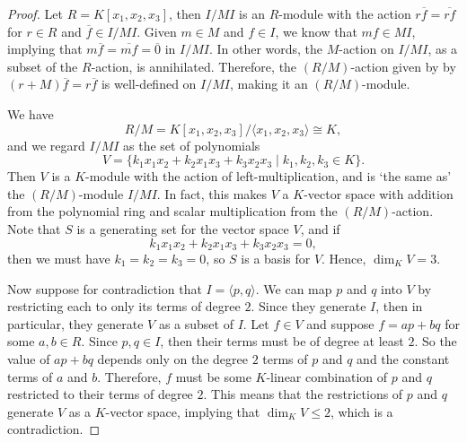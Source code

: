 \documentclass[12pt]{article}
\theoremstyle{definition}
\newcommand{\<}{\langle}
\renewcommand{\>}{\rangle}
\newcommand{\eqc}{\overline}
\newcommand{\isom}{\cong}
\begin{document}
\begin{proof}
    Let $R = K[x_1, x_2, x_3]$, then $I/MI$ is an $R$-module with the action $r\eqc{f} = \eqc{rf}$ for $r \in R$ and $\eqc{f} \in I/MI$. Given $m \in M$ and $f \in I$, we know that $mf \in MI$, implying that $m\eqc{f} = \eqc{mf} = \eqc{0}$ in $I/MI$. In other words, the $M$-action on $I/MI$, as a subset of the $R$-action, is annihilated. Therefore, the $(R/M)$-action given by by $(r + M)\eqc{f} = r\eqc{f}$ is well-defined on $I/MI$, making it an $(R/M)$-module.
    
    We have
    \[
        R/M = K[x_1, x_2, x_3]/\<x_1, x_2, x_3\> \isom K,
    \]
    and we regard $I/MI$ as the set of polynomials
    \[
        V = \{k_1x_1x_2 + k_2x_1x_3 + k_3x_2x_3 \mid k_1, k_2, k_3 \in K\}.
    \]
    Then $V$ is a $K$-module with the action of left-multiplication, and is `the same as' the $(R/M)$-module $I/MI$. In fact, this makes $V$ a $K$-vector space with addition from the polynomial ring and scalar multiplication from the $(R/M)$-action. Note that $S$ is a generating set for the vector space $V$, and if
    \[
        k_1x_1x_2 + k_2x_1x_3 + k_3x_2x_3 = 0,
    \]
    then we must have $k_1 = k_2 = k_3 = 0$, so $S$ is a basis for $V$. Hence, $\dim_K V = 3$. 

    Now suppose for contradiction that $I = \<p, q\>$. We can map $p$ and $q$ into $V$ by restricting each to only its terms of degree $2$. Since they generate $I$, then in particular, they generate $V$ as a subset of $I$. Let $f \in V$ and suppose $f = ap + bq$ for some $a, b \in R$. Since $p, q \in I$, then their terms must be of degree at least $2$. So the value of $ap + bq$ depends only on the degree $2$ terms of $p$ and $q$ and the constant terms of $a$ and $b$. Therefore, $f$ must be some $K$-linear combination of $p$ and $q$ restricted to their terms of degree $2$. This means that the restrictions of $p$ and $q$ generate $V$ as a $K$-vector space, implying that $\dim_K V \leq 2$, which is a contradiction.

\end{proof}
\end{document}
